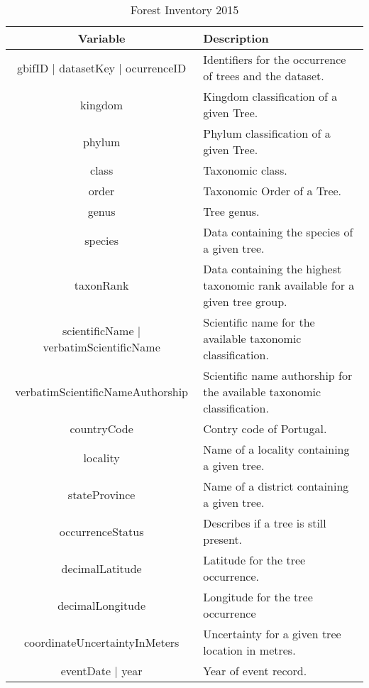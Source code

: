 \begin{table}[H]
	\caption{Forest Inventory 2015}
	\label{forest_inventory}
	\centering
	\small
	\begin{tabular}{cp{7.5cm}} %
		\hline
		\textbf{Variable} & \textbf{Description}\\
		\hline
		gbifID | datasetKey | ocurrenceID  & Identifiers for the occurrence of trees and the dataset. \\
		kingdom & Kingdom classification of a given Tree. \\
		phylum & Phylum classification of a given Tree. \\
		class & Taxonomic class. \\
		order & Taxonomic Order of a Tree. \\
		genus & Tree genus. \\
		species & Data containing the species of a given tree. \\
		taxonRank & Data containing the highest taxonomic rank available for a given tree group. \\
		scientificName | verbatimScientificName & Scientific name for the available taxonomic classification. \\
		
		verbatimScientificNameAuthorship & Scientific name authorship for the available taxonomic classification. \\
		
		countryCode & Contry code of Portugal. \\
		
		locality & Name of a locality containing a given tree. \\
		
		stateProvince &  Name of a district containing a given tree. \\
		
		occurrenceStatus & Describes if a tree is still present.   \\
		
		decimalLatitude & Latitude for the tree occurrence. \\
		
		decimalLongitude & Longitude for the tree occurrence \\
		
		coordinateUncertaintyInMeters & Uncertainty for a given tree location in metres. \\
		
		eventDate | year & Year of event record. \\
		

\end{tabular}
\end{table}
